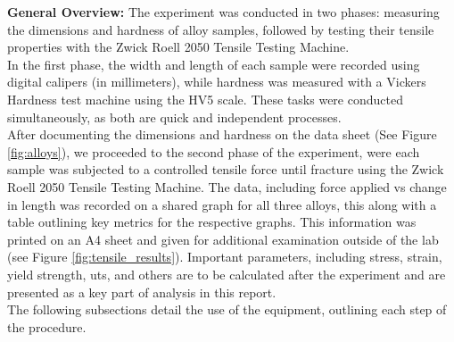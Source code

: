 \documentclass{article}
\begin{document}
\textbf{General Overview:}
The experiment was conducted in two phases: measuring the dimensions and hardness of alloy samples, followed by testing their tensile properties with the Zwick Roell 2050 Tensile Testing Machine. \\[8pt]
In the first phase, the width and length of each sample were recorded using digital calipers (in millimeters), while hardness was measured with a Vickers Hardness test machine using the HV5 scale. These tasks were conducted simultaneously, as both are quick and independent processes.\\[8pt]
After documenting the dimensions and hardness on the data sheet (See Figure \ref{fig:alloys}), we proceeded to the second phase of the experiment, were each sample was subjected to a controlled tensile force until fracture using the Zwick Roell 2050 Tensile Testing Machine. The data, including force applied vs change in length was recorded on a shared graph for all three alloys, this along with a table outlining key metrics for the respective graphs. This information was printed on an A4 sheet and given for additional examination outside of the lab (see Figure \ref{fig:tensile_results}). Important parameters, including stress, strain, yield strength, uts, and others are to be calculated after the experiment and are presented as a key part of analysis in this report.\\[8pt]
The following subsections detail the use of the equipment, outlining each step of the procedure.
\newpage{}
\end{document}
